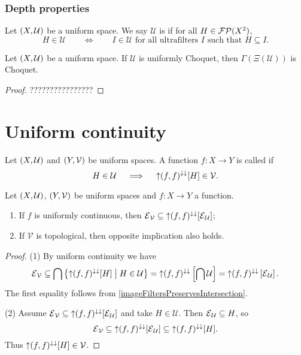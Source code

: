 \subsubsection{Depth properties}
\begin{definition}
Let $\left( X,\mathcal{U} \right)$ be a uniform space. We say $\mathcal{U}$ is  if for all $H\in \operatorname{\mathcal{FP}}(X^2)$,
\[ H\in\mathcal{U} \qquad\iff\qquad \text{$I \in \mathcal{U}$ for all ultrafilters $I$ such that $H\subseteq I$.} \]
\end{definition}

\begin{lemma}
Let $\left( X,\mathcal{U} \right)$ be a uniform space. If $\mathcal{U}$ is uniformly Choquet, then $\Gamma(\Xi(\mathcal{U}))$ is Choquet.
\end{lemma}
\begin{proof}
????????????????
\end{proof}

\section{Uniform continuity}
\begin{definition}
Let $\left( X,\mathcal{U} \right)$ and $\left( Y,\mathcal{V} \right)$ be uniform spaces. A function $f: X\to Y$ is called  if
\[ H\in \mathcal{U} \quad\implies\quad \operatorname{\uparrow} (f, f)^{\downarrow\downarrow}[H]\in \mathcal{V}. \]
\end{definition}


\begin{proposition} \label{uniformContinuityEntourages}
Let $\left( X,\mathcal{U} \right)$, $\left( Y,\mathcal{V} \right)$ be uniform spaces and $f: X\to Y$ a function.
\begin{enumerate}
\item If $f$ is uniformly continuous, then $\operatorname{\mathcal{E}}_\mathcal{V} \subseteq \operatorname{\uparrow} (f, f)^{\downarrow\downarrow}[\operatorname{\mathcal{E}}_\mathcal{U}]$;
\item If $\mathcal{V}$ is topological, then opposite implication also holds.
\end{enumerate}
\end{proposition}
\begin{proof}
(1) By uniform continuity we have
\[ \operatorname{\mathcal{E}}_\mathcal{V} \subseteq \bigcap\left\{ \operatorname{\uparrow} (f, f)^{\downarrow\downarrow}[H] \;\middle|\; H\in \mathcal{U} \right\} = \operatorname{\uparrow} (f, f)^{\downarrow\downarrow}\left[\bigcap \mathcal{U}\right] = \operatorname{\uparrow} (f, f)^{\downarrow\downarrow}\left[\operatorname{\mathcal{E}}_\mathcal{U}\right]. \]
The first equality follows from \ref{imageFiltersPreservesIntersection}.

(2) Assume $\operatorname{\mathcal{E}}_\mathcal{V} \subseteq \operatorname{\uparrow} (f, f)^{\downarrow\downarrow}[\operatorname{\mathcal{E}}_\mathcal{U}]$ and take $H\in \mathcal{U}$. Then $\operatorname{\mathcal{E}}_\mathcal{U}\subseteq H$, so
\[ \operatorname{\mathcal{E}}_\mathcal{V} \subseteq \operatorname{\uparrow} (f, f)^{\downarrow\downarrow}[\operatorname{\mathcal{E}}_\mathcal{U}] \subseteq \operatorname{\uparrow} (f, f)^{\downarrow\downarrow}[H]. \]
Thus $\operatorname{\uparrow} (f, f)^{\downarrow\downarrow}[H] \in\mathcal{V}$.
\end{proof}

